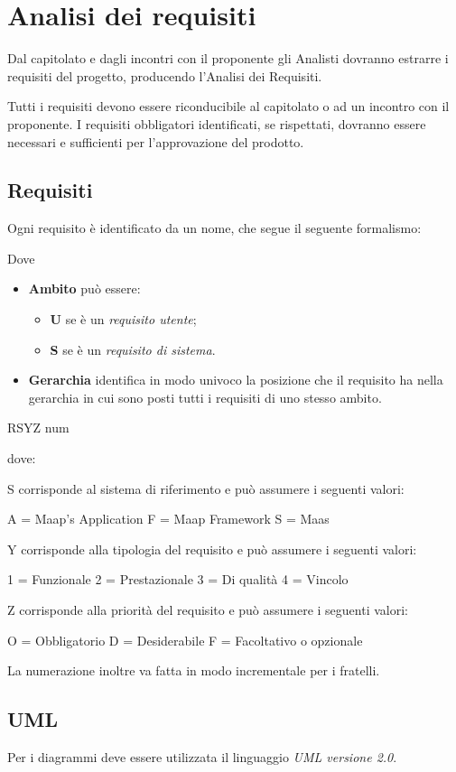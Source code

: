 \section{Analisi dei requisiti}

Dal capitolato e dagli incontri con il proponente gli Analisti dovranno estrarre i requisiti del progetto, producendo l'Analisi dei Requisiti.

Tutti i requisiti devono essere riconducibile al capitolato o ad un incontro con il proponente. I requisiti obbligatori identificati, se rispettati, dovranno essere necessari e sufficienti per l'approvazione del prodotto.

\subsection{Requisiti}

Ogni requisito è identificato da un nome, che segue il seguente formalismo:
\begin{center}
\end{center}

Dove
\begin{itemize}
 \item \textbf{Ambito} può essere:
	\begin{itemize}
	 \item \textbf{U} se è un \emph{requisito utente};
	 \item \textbf{S} se è un \emph{requisito di sistema}.
	\end{itemize}

 \item \textbf{Gerarchia} identifica in modo univoco la posizione che il requisito ha nella gerarchia in cui sono posti tutti i requisiti di uno stesso ambito.
\end{itemize}

RSYZ num

dove:

S corrisponde al sistema di riferimento e può assumere i seguenti valori:

A = Maap's Application
F = Maap Framework
S = Maas

Y corrisponde alla tipologia del requisito e può assumere i seguenti valori:

1 = Funzionale
2 = Prestazionale
3 = Di qualità
4 = Vincolo

Z corrisponde alla priorità del requisito e può assumere i seguenti valori:

O = Obbligatorio
D = Desiderabile
F = Facoltativo o opzionale

La numerazione inoltre va fatta in modo incrementale per i fratelli.

\subsection{UML}

Per i diagrammi deve essere utilizzata il linguaggio \emph{UML versione 2.0}.